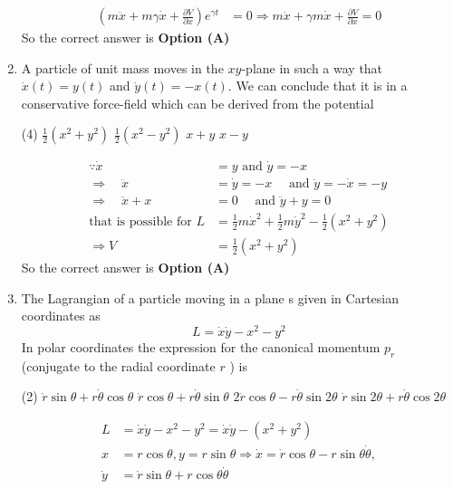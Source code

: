 \begin{enumerate}
\begin{answer}
\begin{align*}
\left(m \ddot{x}+m \gamma \dot{x}+\frac{\partial V}{\partial x}\right) e^{\gamma t}&=0 \Rightarrow m \ddot{x}+\gamma m \dot{x}+\frac{\partial V}{\partial x}=0
\end{align*}
So the correct answer is \textbf{Option (A)}
\end{answer}	
\item A particle of unit mass moves in the $x y$-plane in such a way that $\dot{x}(t)=y(t)$ and $\dot{y}(t)=-x(t) .$ We can conclude that it is in a conservative force-field which can be derived from the potential
{}
\begin{tasks}(4)
\task[\textbf{A.}] $\frac{1}{2}\left(x^{2}+y^{2}\right)$
\task[\textbf{B.}] $\frac{1}{2}\left(x^{2}-y^{2}\right)$
\task[\textbf{C.}] $x+y$
\task[\textbf{D.}] $x-y$
\end{tasks}
\begin{answer}
\begin{align*}
\because \dot{x}&=y\text{ and }\dot{y}=-x\\
\Rightarrow \quad \ddot{x}&=\dot{y}=-x \quad\text{ and }\ddot{y}=-\dot{x}=-y\\
\Rightarrow \quad \ddot{x}+x&=0 \quad\text{ and }\ddot{y}+y=0\\
\text{that is possible for }L&=\frac{1}{2} m \dot{x}^{2}+\frac{1}{2} m \dot{y}^{2}-\frac{1}{2}\left(x^{2}+y^{2}\right) \\\Rightarrow V&=\frac{1}{2}\left(x^{2}+y^{2}\right)
\end{align*}
So the correct answer is \textbf{Option (A)}
\end{answer}	
\item The Lagrangian of a particle moving in a plane s given in Cartesian coordinates as
$$
L=\dot{x} \dot{y}-x^{2}-y^{2}
$$
In polar coordinates the expression for the canonical momentum $p_{r}$ (conjugate to the radial coordinate $r$ ) is
{}
\begin{tasks}(2)
\task[\textbf{A.}] $\dot{r} \sin \theta+r \dot{\theta} \cos \theta$
\task[\textbf{B.}]  $\dot{r} \cos \theta+r \dot{\theta} \sin \theta$
\task[\textbf{C.}] $2 \dot{r} \cos \theta-r \dot{\theta} \sin 2 \theta$
\task[\textbf{D.}] $\dot{r} \sin 2 \theta+r \dot{\theta} \cos 2 \theta$
\end{tasks}
\begin{answer}
\begin{align*}
L&=\dot{x} \dot{y}-x^{2}-y^{2}=\dot{x} \dot{y}-\left(x^{2}+y^{2}\right)\\
x&=r \cos \theta, y=r \sin \theta \Rightarrow \dot{x}=\dot{r} \cos \theta-r \sin \theta \dot{\theta}, \\ \dot{y}&=\dot{r} \sin \theta+r \cos \theta \dot{\theta}\\

\end{align*}
\end{answer}
\end{enumerate}
